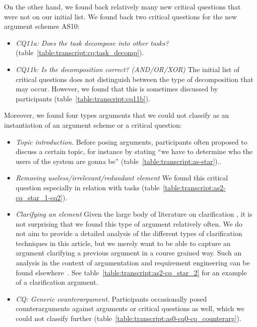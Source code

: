 On the other hand, we found back relatively many new critical questions that were not on our initial list. We found back two critical questions for the new argument schemes AS10:
\begin{itemize}
\item \emph{CQ11a: Does the task decompose into other tasks?} (table~\ref{table:transcript:cq:task_decomp}).
\item \emph{CQ11b: Is the decomposition correct? (AND/OR/XOR)} The initial list of critical questions does not distinguish between the type of decomposition that may occur. However, we found that this is sometimes discussed by participants (table~\ref{table:transcript:cq11b}).
\end{itemize}
Moreover, we found four types arguments that we could not classify as an instantiation of an argument scheme or a critical question:
\begin{itemize}
\item \emph{Topic introduction.} Before posing arguments, participants often proposed to discuss a certain topic, for instance by stating ``we have to determine who the users of the system are gonna be'' (table~\ref{table:transcript:as-star})..
\item \emph{Removing useless/irrelevant/redundant element} We found this critical question especially in relation with tasks (table~\ref{table:transcript:as2-cq_star_1-cq2}).
\item \emph{Clarifying an element} Given the large body of literature on clarification , it is not surprising that we found this type of argument relatively often. We do not aim to provide a detailed analysis of the different types of clarification techniques in this article, but we merely want to be able to capture an argument clarifying a previous argument in a course grained way. Such an analysis in the context of argumentation and requirement engineering can be found elsewhere~\cite{Jureta:RE2008}. See table~\ref{table:transcript:as2-cq_star_2} for an example of a clarification argument.

\item \emph{CQ: Generic counterargument.} Participants occasionally posed counterarguments against arguments or critical questions as well, which we could not classify further (table~\ref{table:transcript:as0-cq0-cq_counterarg}).
\end{itemize}


